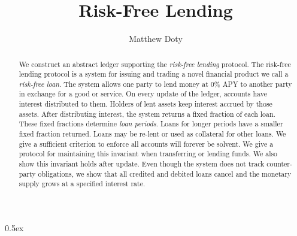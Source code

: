 \documentclass[11pt,a4paper]{article}
\begin{document}
\title{Risk-Free Lending}
\author{Matthew Doty}
\maketitle

\begin{abstract}
  We construct an abstract ledger supporting the \emph{risk-free
    lending} protocol. The risk-free lending protocol is a system for
  issuing and trading a novel financial product we call a
  \emph{risk-free loan}. The system allows one party to lend money at
  0\% APY to another party in exchange for a good or service. On every
  update of the ledger, accounts have interest distributed to them.
  Holders of lent assets keep interest accrued by those assets. After
  distributing interest, the system returns a fixed fraction of each
  loan. These fixed fractions determine \emph{loan periods}. Loans for
  longer periods have a smaller fixed fraction returned. Loans may be
  re-lent or used as collateral for other loans. We give a sufficient
  criterion to enforce all accounts will forever be solvent. We give a
  protocol for maintaining this invariant when transferring or lending
  funds. We also show this invariant holds after update. Even though
  the system does not track counter-party obligations, we show that
  all credited and debited loans cancel and the monetary supply grows
  at a specified interest rate.
\end{abstract}

\tableofcontents

\parindent 0pt\parskip 0.5ex



%
%
\end{document}
